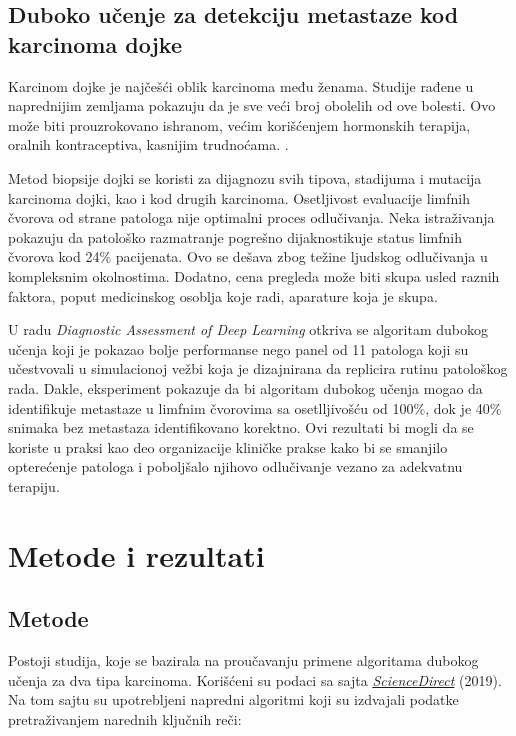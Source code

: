 \documentclass[a4paper]{article}
\begin{document}
\newpage
\subsection{Duboko učenje za detekciju metastaze kod karcinoma dojke}
\label{subsec:podnaslov2}

Karcinom dojke je najčešći oblik karcinoma među ženama. Studije rađene u naprednijim zemljama pokazuju da je sve veći broj obolelih od ove bolesti. Ovo može biti prouzrokovano ishranom, većim korišćenjem hormonskih terapija, oralnih kontraceptiva, kasnijim trudnoćama. \cite{coccia2}.

Metod biopsije dojki se koristi za dijagnozu svih tipova, stadijuma i mutacija karcinoma dojki, kao i kod drugih karcinoma. Osetljivost evaluacije limfnih čvorova od strane patologa nije optimalni proces odlučivanja. Neka istraživanja pokazuju da patološko razmatranje pogrešno dijaknostikuje status limfnih čvorova kod 24\% pacijenata. Ovo se dešava zbog težine ljudskog odlučivanja u kompleksnim okolnostima. Dodatno, cena pregleda može biti skupa usled raznih faktora, poput medicinskog osoblja koje radi, aparature koja je skupa.

U radu \emph{Diagnostic Assessment of Deep Learning} \cite{ehteshami} otkriva se algoritam dubokog učenja koji je pokazao bolje performanse nego panel od 11 patologa koji su učestvovali u simulacionoj vežbi koja je dizajnirana da replicira rutinu patološkog rada. Dakle, eksperiment pokazuje da bi algoritam dubokog učenja mogao da identifikuje metastaze u limfnim čvorovima sa osetlljivošću od 100\%, dok je 40\% snimaka bez metastaza identifikovano korektno. Ovi rezultati bi mogli da se koriste u praksi kao deo organizacije kliničke prakse kako bi se smanjilo opterećenje patologa i poboljšalo njihovo odlučivanje vezano za adekvatnu terapiju.


\newpage
\section{Metode i rezultati}
\label{sec:analiza}



\subsection{Metode}
\label{subsec:podnaslov3}

Postoji studija, koje se bazirala na proučavanju primene algoritama dubokog učenja za dva tipa karcinoma.
Korišćeni su podaci sa sajta \href{https://www.sciencedirect.com/}{\emph{ScienceDirect}} (2019). Na tom sajtu su upotrebljeni napredni algoritmi koji su izdvajali podatke pretraživanjem narednih ključnih reči:
\end{document}
